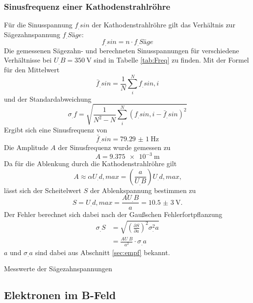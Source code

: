 \subsubsection{Sinusfrequenz einer Kathodenstrahlröhre}
Für die Sinusspannung $f_.{sin}$ der Kathodenstrahlröhre gilt das Verhältnis zur Sägezahnspannung $f_.{Säge}$:
\[
f_.{sin} = n\cdot f_.{Säge}
\]
Die gemessenen Sägezahn- und berechneten Sinusspannungen für verschiedene Verhältnisse bei $U_.B=\SI{350}{\volt}$ sind in Tabelle \ref{tab:Freq} zu finden.
Mit der Formel für den Mittelwert
\[
\bar{f}_.{sin}=\frac{1}{N}\sum_i^Nf_.{sin,i}
\]
und der Standardabweichung 
\[
\sigma_.f=\sqrt{\frac{1}{N^2-N}\sum_i^N\left(f_.{sin,i}-\bar{f}_.{sin}\right)^2}
\]
Ergibt sich eine Sinusfrequenz von
\[
\bar{f}_.{sin}=\SI{79,29(1)}{\hertz}
\]
\noindent Die Amplitude $A$ der Sinusfrequenz wurde gemessen zu
\[
A=\SI{9,375e-3}{\metre}
\]
Da für die Ablenkung durch die Kathodenstrahlröhre gilt 
\[
A\approx\alpha U_.{d,max} = \left(\frac{a}{U_.B}\right)U_.{d,max}\text{,}
\]
lässt sich der Scheitelwert $S$ der Ablenkspannung bestimmen zu
\[
S=U_.{d,max}=\frac{AU_.B}{a}=\SI{10,5(3)}{\volt}\text{.}
\]
Der Fehler berechnet sich dabei nach der Gaußschen Fehlerfortpflanzung
\begin{align*}
\sigma_.S&=\sqrt{\left(\frac{\partial S}{\partial a}\right)^2\sigma^2_.a}\\
&=\frac{AU_.B}{a^2}\cdot \sigma_.a
\end{align*}
$a$ und $\sigma_.a$ sind dabei aus Abschnitt \ref{sec:empf} bekannt.
\begin{table}
\centering
\caption{Messwerte der Sägezahnspannungen}

\label{tab:Freq}
\end{table}

\subsection{Elektronen im B-Feld}
